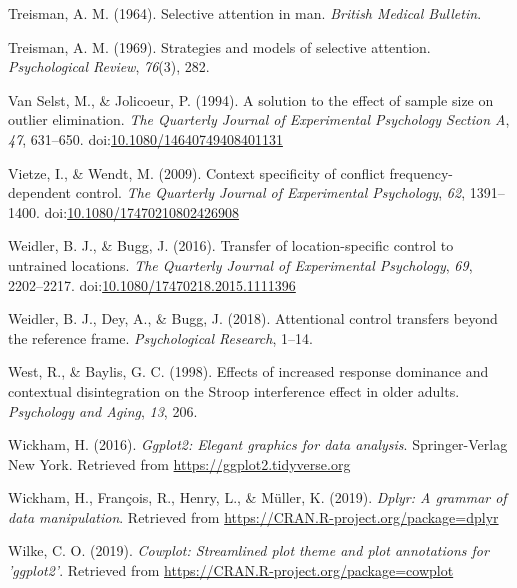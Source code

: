 \documentclass[english,,man,floatsintext]{apa6}
\begin{document}
\leavevmode\hypertarget{ref-treisman_selective_1964}{}%
Treisman, A. M. (1964). Selective attention in man. \emph{British Medical Bulletin}.

\leavevmode\hypertarget{ref-treisman_strategies_1969}{}%
Treisman, A. M. (1969). Strategies and models of selective attention. \emph{Psychological Review}, \emph{76}(3), 282.

\leavevmode\hypertarget{ref-van_selst_solution_1994}{}%
Van Selst, M., \& Jolicoeur, P. (1994). A solution to the effect of sample size on outlier elimination. \emph{The Quarterly Journal of Experimental Psychology Section A}, \emph{47}, 631--650. doi:\href{https://doi.org/10.1080/14640749408401131}{10.1080/14640749408401131}

\leavevmode\hypertarget{ref-vietze_context_2009}{}%
Vietze, I., \& Wendt, M. (2009). Context specificity of conflict frequency-dependent control. \emph{The Quarterly Journal of Experimental Psychology}, \emph{62}, 1391--1400. doi:\href{https://doi.org/10.1080/17470210802426908}{10.1080/17470210802426908}

\leavevmode\hypertarget{ref-weidler_transfer_2016}{}%
Weidler, B. J., \& Bugg, J. (2016). Transfer of location-specific control to untrained locations. \emph{The Quarterly Journal of Experimental Psychology}, \emph{69}, 2202--2217. doi:\href{https://doi.org/10.1080/17470218.2015.1111396}{10.1080/17470218.2015.1111396}

\leavevmode\hypertarget{ref-weidler_attentional_2018}{}%
Weidler, B. J., Dey, A., \& Bugg, J. (2018). Attentional control transfers beyond the reference frame. \emph{Psychological Research}, 1--14.

\leavevmode\hypertarget{ref-west_effects_1998}{}%
West, R., \& Baylis, G. C. (1998). Effects of increased response dominance and contextual disintegration on the Stroop interference effect in older adults. \emph{Psychology and Aging}, \emph{13}, 206.

\leavevmode\hypertarget{ref-r_wickham_ggplot2_2016}{}%
Wickham, H. (2016). \emph{Ggplot2: Elegant graphics for data analysis}. Springer-Verlag New York. Retrieved from \url{https://ggplot2.tidyverse.org}

\leavevmode\hypertarget{ref-r_wickham_dplyr_2019}{}%
Wickham, H., François, R., Henry, L., \& Müller, K. (2019). \emph{Dplyr: A grammar of data manipulation}. Retrieved from \url{https://CRAN.R-project.org/package=dplyr}

\leavevmode\hypertarget{ref-r_cowplot_2019}{}%
Wilke, C. O. (2019). \emph{Cowplot: Streamlined plot theme and plot annotations for 'ggplot2'}. Retrieved from \url{https://CRAN.R-project.org/package=cowplot}

\endgroup
\end{document}
